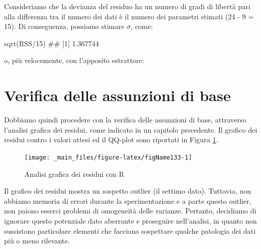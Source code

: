 \documentclass[a4paper,12pt,oneside]{book}
\newenvironment{Shaded}{}{}
\newcommand{\KeywordTok}[1]{#1}
\newcommand{\DecValTok}[1]{#1}
\newcommand{\CommentTok}[1]{#1}
\newcommand{\OperatorTok}[1]{#1}
\newcommand{\NormalTok}[1]{#1}
\begin{document}
Consideriamo che la devianza del residuo ha un numero di gradi di libertà pari alla differenza tra il numero dei dati è il numero dei parametri stimati (24 - 9 = 15). Di conseguenza, possiamo stimare \(\sigma\), come:

\begin{Shaded}
\begin{Highlighting}[]
\KeywordTok{sqrt}\NormalTok{(RSS}\OperatorTok{/}\DecValTok{15}\NormalTok{)}
\CommentTok{## [1] 1.367744}
\end{Highlighting}
\end{Shaded}

o, più velocemente, con l'apposito estrattore:

\begin{Shaded}
\end{Shaded}

\hypertarget{verifica-delle-assunzioni-di-base}{%
\section{Verifica delle assunzioni di base}\label{verifica-delle-assunzioni-di-base}}

Dobbiamo quindi procedere con la verifica delle assunzioni di base, attraverso l'analisi grafica dei residui, come indicato in un capitolo precedente. Il grafico dei residui contro i valori attesi ed il QQ-plot sono riportati in Figura \ref{fig:figName133}.

\begin{figure}

{\centering \texttt{[image: \_main\_files/figure-latex/figName133-1]} 

}

\caption{Analisi grafica dei residui con R}\label{fig:figName133}
\end{figure}

Il grafico dei residui mostra un sospetto outlier (il settimo dato). Tuttavia, non abbiamo memoria di errori durante la sperimentazione e a parte questo outlier, non paiono esserci problemi di omogeneità delle varianze. Pertanto, decidiamo di ignorare questo potenziale dato aberrante e proseguire nell'analisi, in quanto non sussistono particolare elementi che facciano sospettare qualche patologia dei dati più o meno rilevante.
\end{document}
